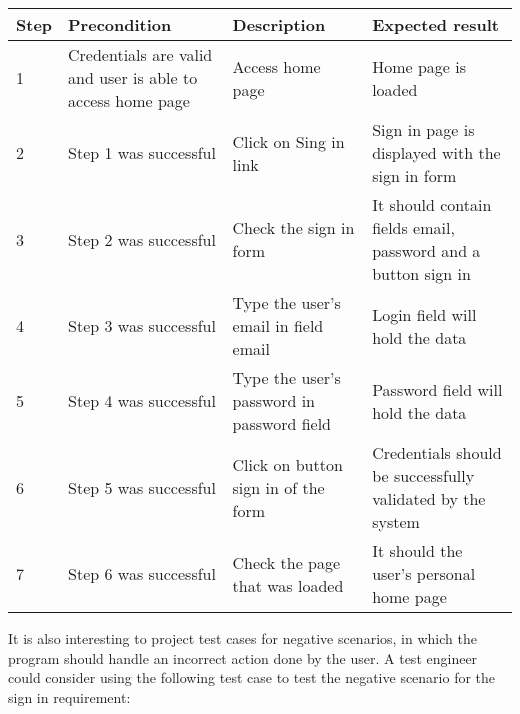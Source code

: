 \begin{center}

\begin{tabular}{| l | p{3cm} | p{5cm} | p{5cm} |}
\hline

Step & Precondition & Description & Expected result \\ \hline

1 & Credentials are valid and user is able to access home page & Access home page & Home page is loaded\\ \hline

2 & Step 1 was successful & Click on Sing in link & Sign in page is displayed with the sign in form \\ \hline

3 & Step 2 was successful & Check the sign in form & It should contain fields email, password and a button sign in \\ \hline

4 & Step 3 was successful & Type the user's email in field email & Login field will hold the data\\ \hline

5 & Step 4 was successful & Type the user's password in password field & Password field will hold the data \\ \hline

6 & Step 5 was successful & Click on button sign in of the form & Credentials should be successfully validated by the system \\ \hline

7 & Step 6 was successful & Check the page that was loaded & It should the user's personal home page\\

\hline
\end{tabular}

\end{center}

It is also interesting to project test cases for negative scenarios, in which the program should handle an incorrect action done by the user. A test engineer could consider using the following test case to test the negative scenario for the sign in requirement:

